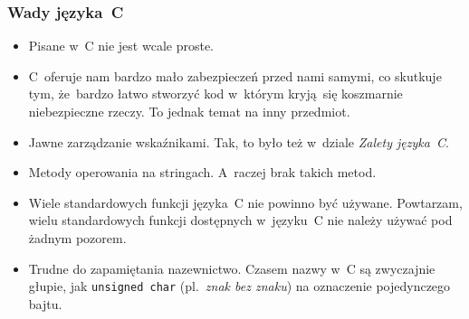 \documentclass[10pt,t]{beamer}
\begin{document}
\begin{frame}
  \frametitle{Wady języka~C}


  \begin{itemize}

  \item Pisane w~C nie jest wcale proste.

  \item C~oferuje nam bardzo mało zabezpieczeń przed nami samymi, co
    skutkuje tym, że~bardzo łatwo stworzyć kod w~którym kryją~się
    koszmarnie niebezpieczne rzeczy. To jednak temat na inny przedmiot.

  \item Jawne zarządzanie wskaźnikami. Tak, to było też w~dziale
    \textit{Zalety języka~C}.

  \item Metody operowania na stringach. A~raczej brak takich metod.

  \item Wiele standardowych funkcji języka~C \alert{nie} powinno być
    używane. Powtarzam, wielu standardowych funkcji dostępnych w~języku~C
    \alert{nie należy} używać pod żadnym pozorem.

  \item Trudne do zapamiętania nazewnictwo. Czasem nazwy w~C są zwyczajnie
    głupie, jak \texttt{unsigned char} (pl.~\textit{znak bez znaku}) na
    oznaczenie pojedynczego bajtu.

  \end{itemize}

\end{frame}
\end{document}
